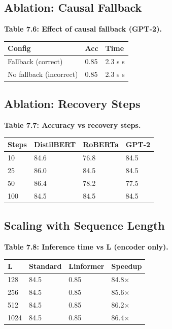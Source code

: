 \subsection{Ablation: Causal Fallback}

\textbf{Table 7.6: Effect of causal fallback (GPT-2).}

\begin{table}[H]
\centering
\small
\begin{tabular}{lll}
\toprule
\textbf{Config} & \textbf{Acc} & \textbf{Time} \\
\midrule
Fallback (correct) & 0.85 & 2.3 s s \\
No fallback (incorrect) & 0.85 & 2.3 s s \\
\bottomrule
\end{tabular}
\end{table}

\subsection{Ablation: Recovery Steps}

\textbf{Table 7.7: Accuracy vs recovery steps.}

\begin{table}[H]
\centering
\small
\begin{tabular}{llll}
\toprule
\textbf{Steps} & \textbf{DistilBERT} & \textbf{RoBERTa} & \textbf{GPT-2} \\
\midrule
10 & 84.6 & 76.8 & 84.5 \\
25 & 86.0 & 84.5 & 84.5 \\
50 & 86.4 & 78.2 & 77.5 \\
100 & 84.5 & 84.5 & 84.5 \\
\bottomrule
\end{tabular}
\end{table}

\subsection{Scaling with Sequence Length}

\textbf{Table 7.8: Inference time vs L (encoder only).}

\begin{table}[H]
\centering
\small
\begin{tabular}{llll}
\toprule
\textbf{L} & \textbf{Standard} & \textbf{Linformer} & \textbf{Speedup} \\
\midrule
128 & 84.5 & 0.85 & 84.8$\times$ \\
256 & 84.5 & 0.85 & 85.6$\times$ \\
512 & 84.5 & 0.85 & 86.2$\times$ \\
1024 & 84.5 & 0.85 & 86.4$\times$ \\
\bottomrule
\end{tabular}
\end{table}

